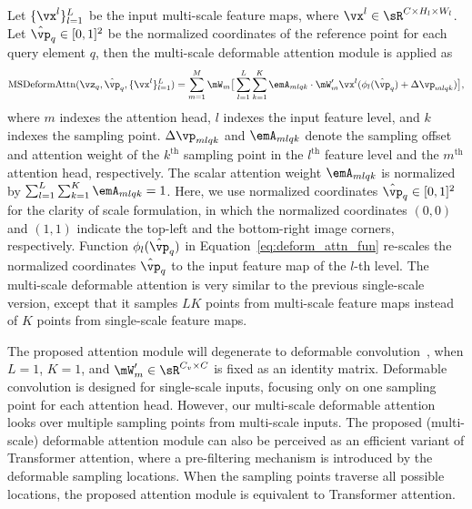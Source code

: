 Let $\{\vx^l\}_{l=1}^{L}$ be the input multi-scale feature maps, where $\vx^l \in \sR^{C \times H_l \times W_l}$. Let $\hat{\vp}_q \in [0, 1]^2$ be the normalized coordinates of the reference point for each query element $q$, then the multi-scale deformable attention module is applied as
\begin{equation}
\text{MSDeformAttn}(\vz_q, \hat{\vp}_q, \{\vx^l\}_{l=1}^{L}) = \sum_{m=1}^{M} \mW_m \big[\sum_{l=1}^{L} \sum_{k=1}^{K} \emA_{mlqk} \cdot \mW'_m \vx^l(\phi_{l}(\hat{\vp}_q) + \Delta\vp_{mlqk})\big],
\label{eq:deform_attn_fun}
\end{equation}
where $m$ indexes the attention head, $l$ indexes the input feature level, and $k$ indexes the sampling point.
$\Delta\vp_{mlqk}$ and $\emA_{mlqk}$ denote the sampling offset and attention weight of the $k^\text{th}$ sampling point in the $l^\text{th}$ feature level and the $m^\text{th}$ attention head, respectively.
The scalar attention weight $\emA_{mlqk}$ is normalized by $\sum_{l=1}^{L} \sum_{k=1}^{K} \emA_{mlqk} = 1$.
Here, we use normalized coordinates $\hat{\vp}_q \in [0, 1]^2$ for the clarity of scale formulation, in which the normalized coordinates $(0, 0)$ and $(1, 1)$ indicate the top-left and the bottom-right image corners, respectively. Function $\phi_{l}(\hat{\vp}_q)$ in Equation~\ref{eq:deform_attn_fun} re-scales the normalized coordinates $\hat{\vp}_q$ to the input feature map of the $l$-th level. The multi-scale deformable attention is very similar to the previous single-scale version, except that it samples $LK$ points from multi-scale feature maps instead of $K$ points from single-scale feature maps.


The proposed attention module will degenerate to deformable convolution~\citep{dai2017deformable}, when $L = 1$, $K = 1$, and $\mW_m' \in \sR^{C_v \times C}$ is fixed as an identity matrix. Deformable convolution is designed for single-scale inputs, focusing only on one sampling point for each attention head. However, our multi-scale deformable attention looks over multiple sampling points from multi-scale inputs. The proposed (multi-scale) deformable attention module can also be perceived as an efficient variant of Transformer attention, where a pre-filtering mechanism is introduced by the deformable sampling locations. When the sampling points traverse all possible locations, the proposed attention module is equivalent to Transformer attention.

